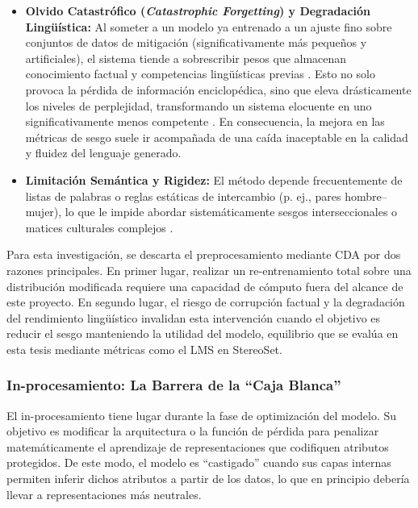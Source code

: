\documentclass[12pt,a4paper]{report}
\begin{document}
\begin{itemize}
    \item \textbf{Olvido Catastrófico (\textit{Catastrophic Forgetting}) y Degradación Lingüística:} Al someter a un modelo ya entrenado a un ajuste fino sobre conjuntos de datos de mitigación (significativamente más pequeños y artificiales), el sistema tiende a sobrescribir pesos que almacenan conocimiento factual y competencias lingüísticas previas \cite{guo_bias_2024}. Esto no solo provoca la pérdida de información enciclopédica, sino que eleva drásticamente los niveles de perplejidad, transformando un sistema elocuente en uno significativamente menos competente \cite{meade_empirical_2021}. En consecuencia, la mejora en las métricas de sesgo suele ir acompañada de una caída inaceptable en la calidad y fluidez del lenguaje generado.
    
    \item \textbf{Limitación Semántica y Rigidez:} El método depende frecuentemente de listas de palabras o reglas estáticas de intercambio (p. ej., pares hombre--mujer), lo que le impide abordar sistemáticamente sesgos interseccionales o matices culturales complejos \cite{meade_empirical_2021, yogarajan_tackling_2023}.
\end{itemize}

Para esta investigación, se descarta el preprocesamiento mediante CDA por dos razones principales. En primer lugar, realizar un re-entrenamiento total sobre una distribución modificada requiere una capacidad de cómputo fuera del alcance de este proyecto. En segundo lugar, el riesgo de corrupción factual y la degradación del rendimiento lingüístico invalidan esta intervención cuando el objetivo es reducir el sesgo manteniendo la utilidad del modelo, equilibrio que se evalúa en esta tesis mediante métricas como el LMS en StereoSet.
\subsubsection{In-procesamiento: La Barrera de la ``Caja Blanca''}

El in-procesamiento tiene lugar durante la fase de optimización del modelo. Su objetivo es modificar la arquitectura o la función de pérdida para penalizar 
matemáticamente el aprendizaje de representaciones que codifiquen atributos protegidos. De este modo, el modelo es ``castigado'' 
cuando sus capas internas permiten inferir dichos atributos a partir de los datos, lo que en principio debería llevar a representaciones más neutrales.
\end{document}
